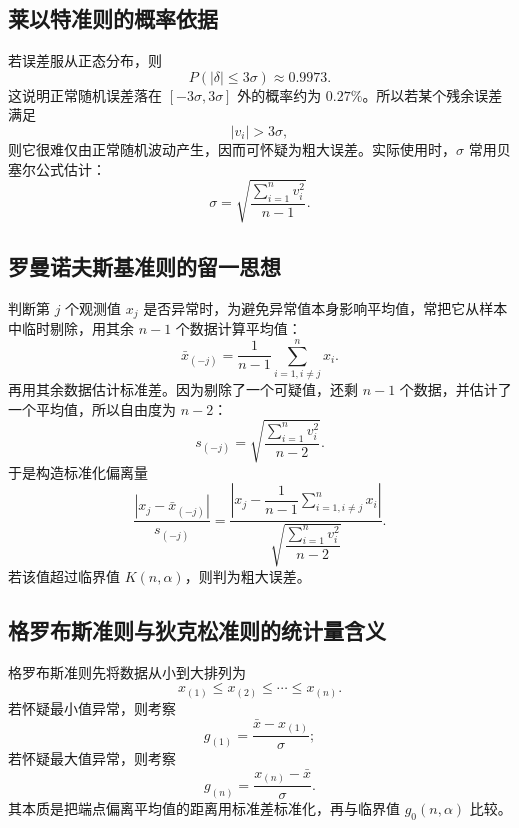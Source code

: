 \documentclass[UTF8,12pt,a4paper]{ctexart}
\newcommand{\abs}[1]{\left|#1\right|}
\begin{document}
\subsection{莱以特准则的概率依据}
若误差服从正态分布，则
\begin{equation*}
    P(\abs{\delta}\le 3\sigma)\approx 0.9973 .
\end{equation*}
这说明正常随机误差落在 $[-3\sigma,3\sigma]$ 外的概率约为 $0.27\%$。所以若某个残余误差满足
\begin{equation*}
    \abs{v_i}>3\sigma,
\end{equation*}
则它很难仅由正常随机波动产生，因而可怀疑为粗大误差。实际使用时，$\sigma$ 常用贝塞尔公式估计：
\begin{equation*}
    \sigma=\sqrt{\frac{\sum_{i=1}^{n}v_i^2}{n-1}} .
\end{equation*}

\subsection{罗曼诺夫斯基准则的留一思想}
判断第 $j$ 个观测值 $x_j$ 是否异常时，为避免异常值本身影响平均值，常把它从样本中临时剔除，用其余 $n-1$ 个数据计算平均值：
\begin{equation*}
    \bar{x}_{(-j)}=\frac{1}{n-1}\sum_{i=1,i\ne j}^{n}x_i .
\end{equation*}
再用其余数据估计标准差。因为剔除了一个可疑值，还剩 $n-1$ 个数据，并估计了一个平均值，所以自由度为 $n-2$：
\begin{equation*}
    s_{(-j)}=\sqrt{\frac{\sum_{i=1}^{n}v_i^2}{n-2}} .
\end{equation*}
于是构造标准化偏离量
\begin{equation*}
    \frac{\abs{x_j-\bar{x}_{(-j)}}}{s_{(-j)}}
    =
    \frac{
    \left|x_j-\dfrac{1}{n-1}\sum_{i=1,i\ne j}^{n}x_i\right|
    }{
    \sqrt{\dfrac{\sum_{i=1}^{n}v_i^2}{n-2}}
    } .
\end{equation*}
若该值超过临界值 $K(n,\alpha)$，则判为粗大误差。

\newpage

\subsection{格罗布斯准则与狄克松准则的统计量含义}
格罗布斯准则先将数据从小到大排列为
\begin{equation*}
    x_{(1)}\le x_{(2)}\le\cdots\le x_{(n)} .
\end{equation*}
若怀疑最小值异常，则考察
\begin{equation*}
    g_{(1)}=\frac{\bar{x}-x_{(1)}}{\sigma};
\end{equation*}
若怀疑最大值异常，则考察
\begin{equation*}
    g_{(n)}=\frac{x_{(n)}-\bar{x}}{\sigma} .
\end{equation*}
其本质是把端点偏离平均值的距离用标准差标准化，再与临界值 $g_0(n,\alpha)$ 比较。
\end{document}
